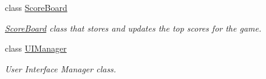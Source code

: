 \begin{DoxyCompactItemize}
class \hyperlink{class_minesweeper_1_1_game_1_1_score_board}{Score\+Board}
\begin{DoxyCompactList}\small\item\em \hyperlink{class_minesweeper_1_1_game_1_1_score_board}{Score\+Board} class that stores and updates the top scores for the game. \end{DoxyCompactList}\item 
class \hyperlink{class_minesweeper_1_1_game_1_1_u_i_manager}{U\+I\+Manager}
\begin{DoxyCompactList}\small\item\em User Interface Manager class. \end{DoxyCompactList}\end{DoxyCompactItemize}
